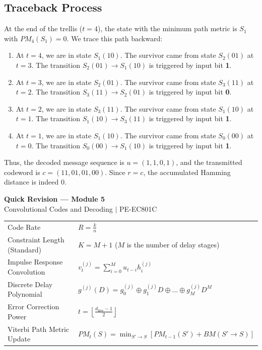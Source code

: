 \documentclass[12pt,a4paper]{article}
\renewcommand{\arraystretch}{1.45}
\begin{document}
\subsection{Traceback Process}
At the end of the trellis ($t=4$), the state with the minimum path metric is $S_1$ with $PM_4(S_1) = 0$. We trace this path backward:
\begin{enumerate}[leftmargin=*, itemsep=3pt]
  \item At $t=4$, we are in state $S_1(10)$. The survivor came from state $S_2(01)$ at $t=3$. The transition $S_2(01) \to S_1(10)$ is triggered by input bit \textbf{1}.
  \item At $t=3$, we are in state $S_2(01)$. The survivor came from state $S_3(11)$ at $t=2$. The transition $S_3(11) \to S_2(01)$ is triggered by input bit \textbf{0}.
  \item At $t=2$, we are in state $S_3(11)$. The survivor came from state $S_1(10)$ at $t=1$. The transition $S_1(10) \to S_3(11)$ is triggered by input bit \textbf{1}.
  \item At $t=1$, we are in state $S_1(10)$. The survivor came from state $S_0(00)$ at $t=0$. The transition $S_0(00) \to S_1(10)$ is triggered by input bit \textbf{1}.
\end{enumerate}
Thus, the decoded message sequence is $u = (1, 1, 0, 1)$, and the transmitted codeword is $c = (11, 01, 01, 00)$.
Since $r = c$, the accumulated Hamming distance is indeed $0$.

\newpage
\begin{center}
  {\large\bfseries\color{myred} Quick Revision --- Module 5}\\[3pt]
  {\small\color{mydark} Convolutional Codes and Decoding $|$ PE-EC801C}
\end{center}
\noindent{\color{myred}\rule{\linewidth}{1.2pt}}
\vspace{4pt}

\begin{tcolorbox}[formulabox, title={\textbf{Key Formulas and Metrics at a Glance}}]
\renewcommand{\arraystretch}{1.35}
\begin{tabularx}{\linewidth}{B{5.0cm} X}
Code Rate & $R = \displaystyle\frac{k}{n}$ \\[4pt]
Constraint Length (Standard) & $K = M + 1$ \quad ($M$ is the number of delay stages) \\[4pt]
Impulse Response Convolution & $v^{(j)}_t = \sum_{i=0}^M u_{t-i} h^{(j)}_i$ \\[4pt]
Discrete Delay Polynomial & $g^{(j)}(D) = g^{(j)}_0 \oplus g^{(j)}_1 D \oplus \dots \oplus g^{(j)}_M D^M$ \\[4pt]
Error Correction Power & $t = \left\lfloor \displaystyle\frac{d_{\text{free}} - 1}{2} \right\rfloor$ \\[4pt]
Viterbi Path Metric Update & $PM_t(S) = \min_{S' \to S} \left[ PM_{t-1}(S') + BM(S' \to S) \right]$
\end{tabularx}
\end{tcolorbox}
\end{document}
